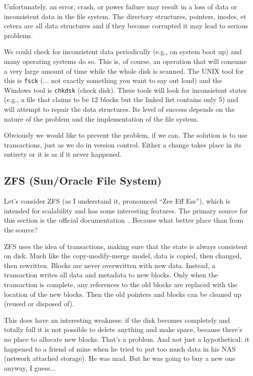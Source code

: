 \documentclass[a4paper]{report}
\begin{document}
Unfortunately, an error, crash, or power failure may result in a loss of data or inconsistent data in the file system. The directory structures, pointers, inodes, et cetera are all data structures and if they become corrupted it may lead to serious problems.

We could check for inconsistent data periodically (e.g., on system boot up) and many operating systems do so. This is, of course, an operation that will consume a very large amount of time while the whole disk is scanned. The UNIX tool for this is \texttt{fsck} (... not exactly something you want to say out loud) and the Windows tool is \texttt{chkdsk} (check disk). These tools will look for inconsistent states (e.g., a file that claims to be 12 blocks but the linked list contains only 5) and will attempt to repair the data structures. Its level of success depends on the nature of the problem and the implementation of the file system.

Obviously we would like to prevent the problem, if we can. The solution is to use transactions, just as we do in version control. Either a change takes place in its entirety or it is as if it never happened.


\subsection*{ZFS (Sun/Oracle File System)}
Let's consider ZFS (as I understand it, pronounced ``Zee Eff Ess''), which is intended for scalability and has some interesting features. The primary source for this section is the official documentation~\cite{zfs}. Because what better place than from the source?

ZFS uses the idea of transactions, making sure that the state is always consistent on disk. Much like the copy-modify-merge model, data is copied, then changed, then rewritten. Blocks are never overwritten with new data. Instead, a transaction writes all data and metadata to new blocks. Only when the transaction is complete, any references to the old blocks are replaced with the location of the new blocks. Then the old pointers and blocks can be cleaned up (reused or disposed of).

This does have an interesting weakness: if the disk becomes completely and totally full it is not possible to delete anything and make space, because there's no place to allocate new blocks. That's a problem. And not just a hypothetical: it happened to a friend of mine when he tried to put too much data in his NAS (network attached storage). He was mad. But he was going to buy a new one anyway, I guess...
\end{document}
